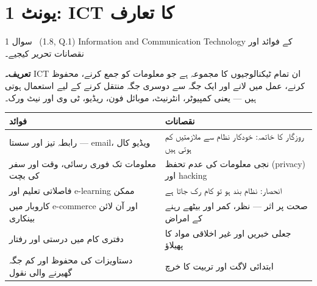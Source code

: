 %

\section*{یونٹ \textenglish{1}: \textenglish{ICT} کا تعارف}

\begin{sawal}{سوال \textenglish{1} \ \textnormal{\small(\textenglish{1.8, Q.1})}}
\textenglish{Information and Communication Technology} کے فوائد اور نقصانات
تحریر کیجیے۔
\end{sawal}

\begin{hal}
\textbf{تعریف۔} \textenglish{ICT} ان تمام ٹیکنالوجیوں کا مجموعہ ہے جو معلومات
کو جمع کرنے، محفوظ کرنے، عمل میں لانے اور ایک جگہ سے دوسری جگہ منتقل کرنے کے
لیے استعمال ہوتی ہیں --- یعنی کمپیوٹر، انٹرنیٹ، موبائل فون، ریڈیو، ٹی وی اور
نیٹ ورک۔

\medskip
\begin{center}
\begin{tabular}{@{}p{7.0cm} p{7.0cm}@{}}
\toprule
\textbf{فوائد} & \textbf{نقصانات} \\
\midrule
رابطہ تیز اور سستا --- \textenglish{email}، ویڈیو کال & روزگار کا خاتمہ: خودکار نظام سے ملازمتیں کم ہوتی ہیں \\
معلومات تک فوری رسائی، وقت اور سفر کی بچت & نجی معلومات کی عدم تحفظ (\textenglish{privacy}) اور \textenglish{hacking} \\
فاصلاتی تعلیم اور \textenglish{e-learning} ممکن & انحصار: نظام بند ہو تو کام رک جاتا ہے \\
کاروبار میں \textenglish{e-commerce} اور آن لائن بینکاری & صحت پر اثر --- نظر، کمر اور بیٹھے رہنے کے امراض \\
دفتری کام میں درستی اور رفتار & جعلی خبریں اور غیر اخلاقی مواد کا پھیلاؤ \\
دستاویزات کی محفوظ اور کم جگہ گھیرنے والی نقول & ابتدائی لاگت اور تربیت کا خرچ \\
\bottomrule
\end{tabular}
\end{center}

\end{hal}

